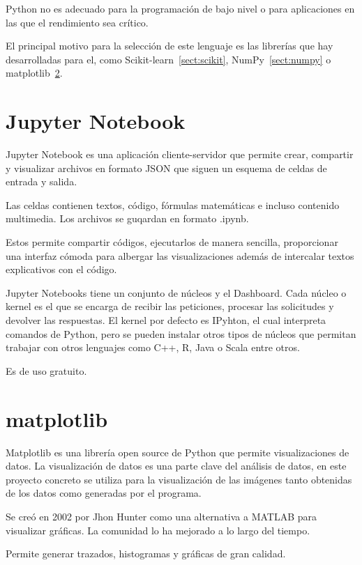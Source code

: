 Python no es adecuado para la programación de bajo nivel o para aplicaciones en las que el rendimiento sea crítico.

El principal motivo para la selección de este lenguaje es las librerías que hay desarrolladas para el, como Scikit-learn~\ref{sect:scikit}, NumPy~\ref{sect:numpy} o matplotlib~\ref{sect:matplotlib}.

\section{Jupyter Notebook}

Jupyter Notebook\cite{ionosJupyterNotebook} es una aplicación cliente-servidor que permite crear, compartir y visualizar archivos en formato JSON que siguen un esquema de celdas de entrada y salida.

Las celdas contienen textos, código, fórmulas matemáticas e incluso contenido multimedia. Los archivos se guqardan en formato .ipynb.

Estos permite compartir códigos, ejecutarlos de manera sencilla, proporcionar una interfaz cómoda para albergar las visualizaciones además de intercalar textos explicativos con el código.

Jupyter Notebooks tiene un conjunto de núcleos y el Dashboard. Cada núcleo o kernel es el que se encarga de recibir las peticiones, procesar las solicitudes y devolver las respuestas. El kernel por defecto es IPyhton, el cual interpreta comandos de Python, pero se pueden instalar otros tipos de núcleos que permitan trabajar con otros lenguajes como C++, R, Java o Scala entre otros.

Es de uso gratuito.

\section{matplotlib}\label{sect:matplotlib}

Matplotlib\cite{datascientestMatplotlibTodo} es una librería open source de Python que permite visualizaciones de datos. La visualización de datos es una parte clave del análisis de datos, en este proyecto concreto se utiliza para la visualización de las imágenes tanto obtenidas de los datos como generadas por el programa.

Se creó en 2002 por Jhon Hunter como una alternativa a MATLAB para visualizar gráficas. La comunidad lo ha mejorado a lo largo del tiempo. 

Permite generar trazados, histogramas y gráficas de gran calidad. 

